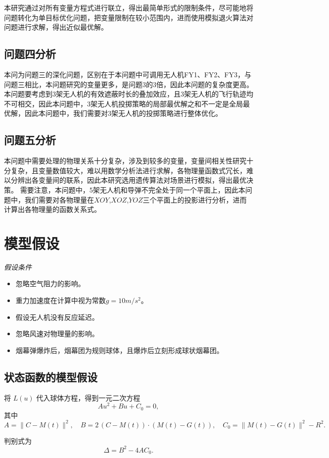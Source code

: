 \documentclass{article}
\begin{document}
本研究通过对所有变量方程式进行联立，得出最简单形式的限制条件，尽可能地将问题转化为单目标优化问题，把变量限制在较小范围内，进而使用模拟退火算法对问题进行求解，得出近似最优解。
\subsection{问题四分析}
本问为问题三的深化问题，区别在于本问题中可调用无人机FY1、FY2、FY3，与问题三相比，本问题研究的变量更多，是问题3的3倍，因此本问题的复杂度更高。
本问题要考虑到3架无人机的有效遮蔽时长的叠加效应，且3架无人机的飞行轨迹均不可相交，因此本问题中，3架无人机投掷策略的局部最优解之和不一定是全局最优解，因此本问题中，我们需要对3架无人机的投掷策略进行整体优化。

\subsection{问题五分析}
本问题中需要处理的物理关系十分复杂，涉及到较多的变量，变量间相关性研究十分复杂，且变量数值较大，难以用数学分析法进行求解，各物理量函数式冗长，难以分辨出各变量间的联系，因此本研究选用遗传算法对场景进行模拟，得出最优决策。
需要注意，本问题中，5架无人机和导弹不完全处于同一个平面上，因此本问题中，我们需要对各物理量在$XOY$,$XOZ$,$YOZ$三个平面上的投影进行分析，进而计算出各物理量的函数关系式。

\section{模型假设}

\textit{假设条件}
\begin{itemize}
    \item 忽略空气阻力的影响。
    \item 重力加速度在计算中视为常数$g = 10m/s^2$。
    \item 假设无人机没有反应延迟。
    \item 忽略风速对物理量的影响。
    \item 烟幕弹爆炸后，烟幕团为规则球体，且爆炸后立刻形成球状烟幕团。
\end{itemize}
\subsection{状态函数的模型假设}
将 $L(u)$ 代入球体方程，得到一元二次方程
\[
A u^2 + B u + C_0 = 0,
\]
其中
\[
A = \|C - M(t)\|^2, \quad
B = 2\,(C - M(t)) \cdot (M(t) - G(t)), \quad
C_0 = \|M(t) - G(t)\|^2 - R^2.
\]

判别式为
\[
\Delta = B^2 - 4AC_0.
\]
\end{document}
